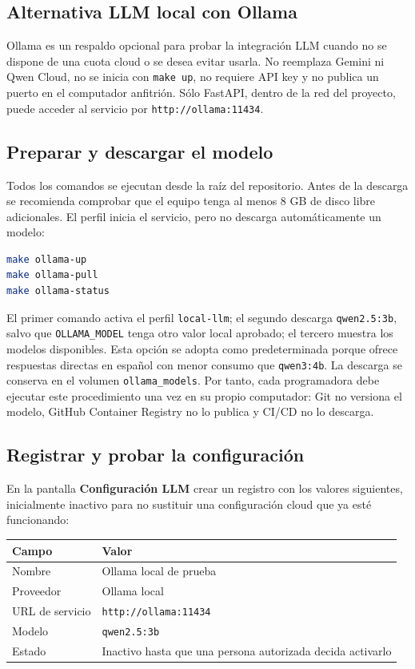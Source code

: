 \documentclass[11pt,letterpaper]{article}
\newcommand{\file}[1]{\texttt{#1}}
\begin{document}
\subsection{Alternativa LLM local con Ollama}

Ollama es un respaldo opcional para probar la integración LLM cuando no se dispone de una cuota cloud o se desea evitar usarla. No reemplaza Gemini ni Qwen Cloud, no se inicia con \file{make up}, no requiere API key y no publica un puerto en el computador anfitrión. Sólo FastAPI, dentro de la red del proyecto, puede acceder al servicio por \file{http://ollama:11434}.

\subsection{Preparar y descargar el modelo}

Todos los comandos se ejecutan desde la raíz del repositorio. Antes de la descarga se recomienda comprobar que el equipo tenga al menos 8 GB de disco libre adicionales. El perfil inicia el servicio, pero no descarga automáticamente un modelo:

\begin{lstlisting}[style=terminal,language=bash]
make ollama-up
make ollama-pull
make ollama-status
\end{lstlisting}

El primer comando activa el perfil \file{local-llm}; el segundo descarga \file{qwen2.5:3b}, salvo que \file{OLLAMA\_MODEL} tenga otro valor local aprobado; el tercero muestra los modelos disponibles. Esta opción se adopta como predeterminada porque ofrece respuestas directas en español con menor consumo que \file{qwen3:4b}. La descarga se conserva en el volumen \file{ollama\_models}. Por tanto, cada programadora debe ejecutar este procedimiento una vez en su propio computador: Git no versiona el modelo, GitHub Container Registry no lo publica y CI/CD no lo descarga.

\subsection{Registrar y probar la configuración}

En la pantalla \textbf{Configuración LLM} crear un registro con los valores siguientes, inicialmente inactivo para no sustituir una configuración cloud que ya esté funcionando:

\begin{center}
\begin{tabularx}{0.88\textwidth}{@{}l X@{}}
  \toprule
  Campo & Valor \\
  \midrule
  Nombre & Ollama local de prueba \\
  Proveedor & Ollama local \\
  URL de servicio & \file{http://ollama:11434} \\
  Modelo & \file{qwen2.5:3b} \\
  Estado & Inactivo hasta que una persona autorizada decida activarlo \\
  \bottomrule
\end{tabularx}
\end{center}
\end{document}
